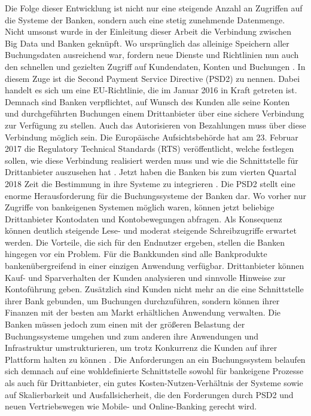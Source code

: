 \documentclass[12pt,oneside,a4paper,parskip]{scrbook}
\begin{document}
Die Folge dieser Entwicklung ist nicht nur eine steigende Anzahl an Zugriffen auf die Systeme der Banken, sondern auch eine stetig zunehmende Datenmenge. Nicht umsonst wurde in der Einleitung dieser Arbeit die Verbindung zwischen Big Data und Banken geknüpft. Wo ursprünglich das alleinige Speichern aller Buchungsdaten ausreichend war, fordern neue Dienste und Richtlinien nun auch den schnellen und gezielten Zugriff auf Kundendaten, Konten und Buchungen \cite{bigdataBigStorage}. In diesem Zuge ist die Second Payment Service Directive (PSD2) zu nennen. Dabei handelt es sich um eine EU-Richtlinie, die im Januar 2016 in Kraft getreten ist. Demnach sind Banken verpflichtet, auf Wunsch des Kunden alle seine Konten und durchgeführten Buchungen einem Drittanbieter über eine sichere Verbindung zur Verfügung zu stellen. Auch das Autorisieren von Bezahlungen muss über diese Verbindung möglich sein. Die Europäische Aufsichtsbehörde hat am 23. Februar 2017 die Regulatory Technical Standards (RTS) veröffentlicht, welche festlegen sollen, wie diese Verbindung realisiert werden muss und wie die Schnittstelle für Drittanbieter auszusehen hat \cite{rts}. Jetzt haben die Banken bis zum vierten Quartal 2018 Zeit die Bestimmung in ihre Systeme zu integrieren \cite{eu-psd2}\cite{psd2dk}. Die PSD2 stellt eine enorme Herausforderung für die Buchungssysteme der Banken dar. Wo vorher nur Zugriffe von bankeigenen Systemen möglich waren, können jetzt beliebige Drittanbieter Kontodaten und Kontobewegungen abfragen. Als Konsequenz können deutlich steigende Lese- und moderat steigende Schreibzugriffe erwartet werden. Die Vorteile, die sich für den Endnutzer ergeben, stellen die Banken hingegen vor ein Problem. Für die Bankkunden sind alle Bankprodukte bankenübergreifend in einer einzigen Anwendung verfügbar. Drittanbieter können Kauf- und Sparverhalten der Kunden analysieren und sinnvolle Hinweise zur Kontoführung geben. Zusätzlich sind Kunden nicht mehr an die eine Schnittstelle ihrer Bank gebunden, um Buchungen durchzuführen, sondern können ihrer Finanzen mit der besten am Markt erhältlichen Anwendung verwalten. Die Banken müssen jedoch zum einen mit der größeren Belastung der Buchungssysteme umgehen und zum anderen ihre Anwendungen und Infrastruktur umstrukturieren, um trotz Konkurrenz die Kunden auf ihrer Plattform halten zu können \cite{psd2vid}.
Die Anforderungen an ein Buchungssystem belaufen sich demnach auf eine wohldefinierte Schnittstelle sowohl für bankeigene Prozesse als auch für Drittanbieter, ein gutes Kosten-Nutzen-Verhältnis der Systeme sowie auf Skalierbarkeit und Ausfallsicherheit, die den Forderungen durch PSD2 und neuen Vertriebswegen wie Mobile- und Online-Banking gerecht wird.
\end{document}
